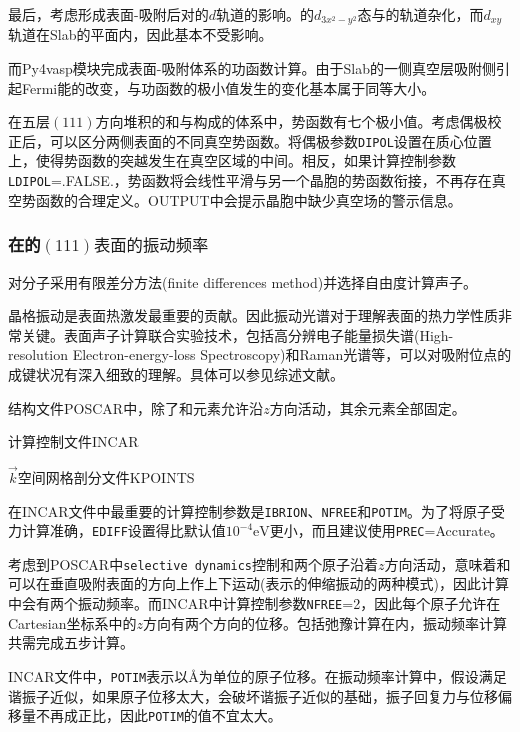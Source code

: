 最后，考虑形成表面-吸附后对的$d$轨道的影响。的$d_{3x^2-y^2}$态与的轨道杂化，而$d_{xy}$轨道在\textrm{Slab}的平面内，因此基本不受影响。

而\textrm{Py4vasp}模块完成表面-吸附体系的功函数计算。由于\textrm{Slab}的一侧真空层吸附侧引起\textrm{Fermi}能的改变，与功函数的极小值发生的变化基本属于同等大小。

在五层$(111)$方向堆积的和与构成的体系中，势函数有七个极小值。考虑偶极校正后，可以区分两侧表面的不同真空势函数。将偶极参数\texttt{DIPOL}设置在质心位置上，使得势函数的突越发生在真空区域的中间。相反，如果计算控制参数\texttt{LDIPOL}=\textrm{.FALSE.}，势函数将会线性平滑与另一个晶胞的势函数衔接，不再存在真空势函数的合理定义。\textrm{OUTPUT}中会提示晶胞中缺少真空场的警示信息。

\subsubsection{在的$(111)表面的振动频率$}
对分子采用有限差分方法\textrm{(finite differences method)}并选择自由度计算声子。

晶格振动是表面热激发最重要的贡献。因此振动光谱对于理解表面的热力学性质非常关键。表面声子计算联合实验技术，包括高分辨电子能量损失谱\textrm{(High-resolution Electron-energy-loss Spectroscopy)}和\textrm{Raman}光谱等，可以对吸附位点的成键状况有深入细致的理解。具体可以参见综述文献\cite{APA53-377_1991}。


结构文件\textrm{POSCAR}中，除了和元素允许沿$z$方向活动，其余元素全部固定。

计算控制文件\textrm{INCAR}

$\vec k$空间网格剖分文件\textrm{KPOINTS}

在\textrm{INCAR}文件中最重要的计算控制参数是\texttt{IBRION}、\texttt{NFREE}和\texttt{POTIM}。为了将原子受力计算准确，\texttt{EDIFF}设置得比默认值$10^{-4}\mathrm{eV}$更小，而且建议使用\texttt{PREC}=\textrm{Accurate}。

考虑到\textrm{POSCAR}中\texttt{selective dynamics}控制和两个原子沿着$z$方向活动，意味着和可以在垂直吸附表面的方向上作上下运动(表示的伸缩振动的两种模式)，因此计算中会有两个振动频率。而\textrm{INCAR}中计算控制参数\texttt{NFREE}=2，因此每个原子允许在\textrm{Cartesian}坐标系中的$z$方向有两个方向的位移。包括弛豫计算在内，振动频率计算共需完成五步计算。

\textrm{INCAR}文件中，\texttt{POTIM}表示以\textrm{\AA}为单位的原子位移。在振动频率计算中，假设满足谐振子近似，如果原子位移太大，会破坏谐振子近似的基础，振子回复力与位移偏移量不再成正比，因此\texttt{POTIM}的值不宜太大。

